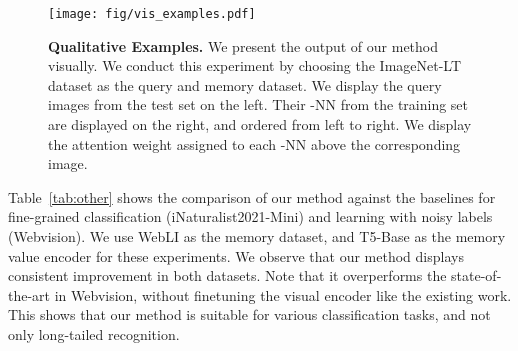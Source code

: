 \begin{figure*}
\begin{center}
\texttt{[image: fig/vis\_examples.pdf]}
\end{center}
\caption{
\textbf{Qualitative Examples.} 
We present the output of our method visually. 
We conduct this experiment by choosing the ImageNet-LT dataset as the query and memory dataset.
We display the query images from the test set on the left.
Their -NN from the training set are displayed on the right, and ordered from left to right.
We display the attention weight assigned to each -NN above the corresponding image.
\label{fig:qual}
\vspace{-0.2cm}
}
\end{figure*}


Table~\ref{tab:other} shows the comparison of our method against the baselines for fine-grained classification (iNaturalist2021-Mini) and learning with noisy labels (Webvision). 
We use WebLI as the memory dataset, and T5-Base as the memory value encoder for these experiments.
We observe that our method displays consistent improvement in both datasets.
Note that it overperforms the state-of-the-art in Webvision, without finetuning the visual encoder like the existing work.
This shows that our method is suitable for various classification tasks, and not only long-tailed recognition.

